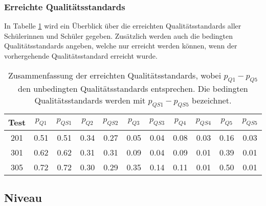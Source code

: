 \subsubsection{Erreichte Qualitätsstandards}

In Tabelle \ref{tab:QS} wird ein Überblick über die erreichten Qualitätsstandards aller Schülerinnen und Schüler gegeben. Zusätzlich werden auch die bedingten Qualitätsstandards angeben, welche nur erreicht werden können, wenn der vorhergehende Qualitätsstandard erreicht wurde.


\begin{table}[!htbp]
  \centering
\begin{tabular}{ccccccccccc}
\toprule
 Test & $p_{Q1}$ & $p_{QS1}$ & $p_{Q2}$ & $p_{QS2}$& $p_{Q3}$& $p_{QS3}$& $p_{Q4}$& $p_{QS4}$& $p_{Q5}$& $p_{QS5}$\\ 
\midrule
 201 &   0.51 & 0.51& 0.34 & 0.27 & 0.05 & 0.04 & 0.08 & 0.03 & 0.16 & 0.03 \\ 
 301 &   0.62 & 0.62& 0.31 & 0.31 & 0.09 & 0.04 & 0.09 & 0.01 & 0.39 & 0.01\\ 
 305 &   0.72 & 0.72& 0.30 & 0.29 & 0.35 & 0.14 & 0.11 & 0.01 & 0.50 & 0.01\\ 
\bottomrule
 
\end{tabular} 

  \caption{Zusammenfassung der erreichten Qualitätsstandards, wobei $p_{Q1} - p_{Q5}$ den unbedingten Qualitätsstandards entsprechen. Die bedingten Qualitätsstandards werden mit $p_{QS1} - p_{QS5}$ bezeichnet.}
  \label{tab:QS}
\end{table}

\subsection{Niveau}

